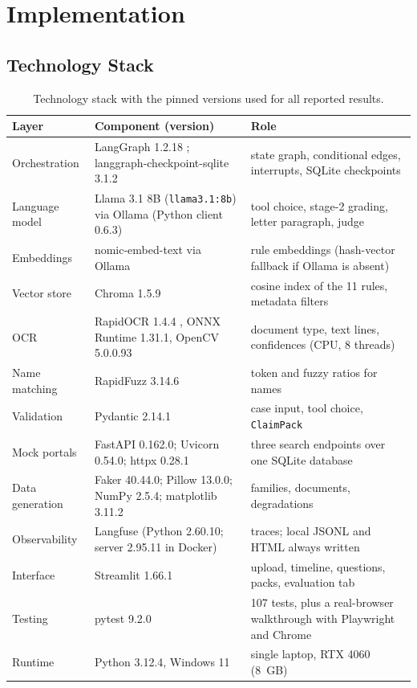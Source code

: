 \chapter{Implementation}\label{ch:impl}
\section{Technology Stack}
\begin{table}[H]
\centering\footnotesize{}
\caption[Technology stack]{Technology stack with the pinned versions used for all reported results.}\label{tab:stack}
\renewcommand{\arraystretch}{1.1}
\begin{tabularx}{\linewidth}{@{}p{3.1cm}p{3.7cm}X@{}}
\toprule
\textbf{Layer} & \textbf{Component (version)} & \textbf{Role} \\ \midrule
Orchestration & LangGraph 1.2.18 \cite{langgraph}; langgraph-checkpoint-sqlite 3.1.2 & state graph, conditional edges, interrupts, SQLite checkpoints \\
Language model & Llama 3.1 8B \cite{llama3} (\texttt{llama3.1:8b}) via Ollama \cite{ollama} (Python client 0.6.3) & tool choice, stage-2 grading, letter paragraph, judge \\
Embeddings & nomic-embed-text \cite{nomic2024} via Ollama & rule embeddings (hash-vector fallback if Ollama is absent) \\
Vector store & Chroma 1.5.9 \cite{chroma} & cosine index of the 11 rules, metadata filters \\
OCR & RapidOCR 1.4.4 \cite{rapidocr}, ONNX Runtime 1.31.1, OpenCV 5.0.0.93 & document type, text lines, confidences (CPU, 8 threads) \\
Name matching & RapidFuzz 3.14.6 & token and fuzzy ratios for names \\
Validation & Pydantic 2.14.1 & case input, tool choice, \texttt{ClaimPack} \\
Mock portals & FastAPI 0.162.0; Uvicorn 0.54.0; httpx 0.28.1 & three search endpoints over one SQLite database \\
Data generation & Faker 40.44.0; Pillow 13.0.0; NumPy 2.5.4; matplotlib 3.11.2 & families, documents, degradations \\
Observability & Langfuse \cite{langfuse} (Python 2.60.10; server 2.95.11 in Docker) & traces; local JSONL and HTML always written \\
Interface & Streamlit 1.66.1 & upload, timeline, questions, packs, evaluation tab \\
Testing & pytest 9.2.0 & 107 tests, plus a real-browser walkthrough with Playwright and Chrome \\
Runtime & Python 3.12.4, Windows 11 & single laptop, RTX 4060 (8~GB) \\ \bottomrule
\end{tabularx}
\end{table}

